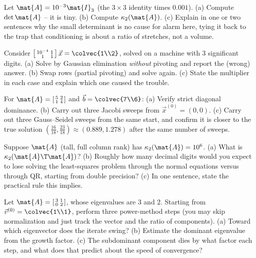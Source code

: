 \begin{exercise}
Let $\mat{A}=10^{-3}\mat{I}_3$ (the $3\times 3$ identity times $0.001$). (a) Compute
$\det\mat{A}$ -- it is tiny. (b) Compute $\kappa_2(\mat{A})$. (c) Explain in one or two
sentences why the small determinant is no cause for alarm here, tying it back to the
trap that conditioning is about a ratio of stretches, not a volume.
\end{exercise}

\begin{exercise}
Consider $\left[\begin{smallmatrix}10^{-4} & 1\\ 1 & 1\end{smallmatrix}\right]\vec{x}=
\colvec{1\\2}$, solved on a machine with $3$ significant digits. (a) Solve by Gaussian
elimination \emph{without} pivoting and report the (wrong) answer. (b) Swap rows
(partial pivoting) and solve again. (c) State the multiplier in each case and explain
which one caused the trouble.
\end{exercise}

\begin{exercise}
For $\mat{A}=\left[\begin{smallmatrix}5 & 2\\ 1 & 4\end{smallmatrix}\right]$ and
$\vec{b}=\colvec{7\\6}$: (a) Verify strict diagonal dominance. (b) Carry out three
Jacobi sweeps from $\vec{x}^{(0)}=(0,0)$. (c) Carry out three Gauss--Seidel sweeps from
the same start, and confirm it is closer to the true solution $(\tfrac{16}{18},
\tfrac{23}{18})\approx(0.889,1.278)$ after the same number of sweeps.
\end{exercise}

\begin{exercise}
Suppose $\mat{A}$ (tall, full column rank) has $\kappa_2(\mat{A})=10^{6}$. (a) What is
$\kappa_2(\mat{A}\T\mat{A})$? (b) Roughly how many decimal digits would you expect to
lose solving the least-squares problem through the normal equations versus through QR,
starting from double precision? (c) In one sentence, state the practical rule this
implies.
\end{exercise}

\begin{exercise}
Let $\mat{A}=\left[\begin{smallmatrix}3 & 1\\ 0 & 2\end{smallmatrix}\right]$, whose
eigenvalues are $3$ and $2$. Starting from $\vec{v}^{(0)}=\colvec{1\\1}$, perform three
power-method steps (you may skip normalization and just track the vector and the ratio
of components). (a) Toward which eigenvector does the iterate swing? (b) Estimate the
dominant eigenvalue from the growth factor. (c) The subdominant component dies by what
factor each step, and what does that predict about the speed of convergence?
\end{exercise}

